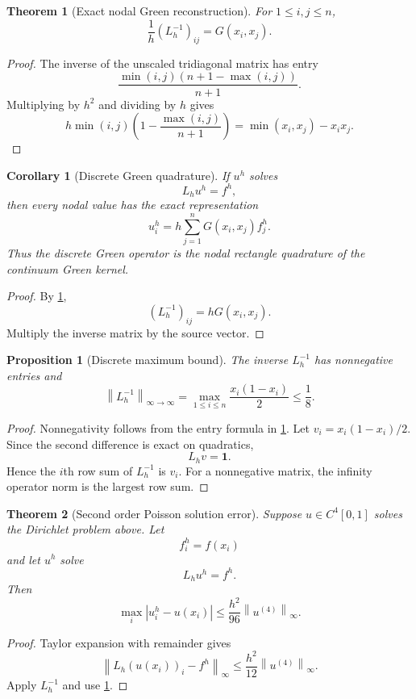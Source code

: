 \documentclass{aomart}
\newtheorem{theorem}{Theorem}[section]
\newtheorem{proposition}[proposition]{Proposition}
\newtheorem{corollary}[corollary]{Corollary}
\theoremstyle{definition}
\theoremstyle{remark}
\newcommand{\one}{\bm 1}
\newcommand{\norm}[1]{\left\lVert#1\right\rVert}
\newcommand{\abs}[1]{\left\lvert#1\right\rvert}
\begin{document}
\begin{theorem}[Exact nodal Green reconstruction]\label{thm:nodal_green}
For \(1\leq i,j\leq n\),
\[
\frac{1}{h}(L_h^{-1})_{ij}
=
G(x_i,x_j).
\]
\end{theorem}

\begin{proof}
The inverse of the unscaled tridiagonal matrix has entry
\[
\frac{\min(i,j)(n+1-\max(i,j))}{n+1}.
\]
Multiplying by \(h^2\) and dividing by \(h\) gives
\[
h\min(i,j)
\left(1-\frac{\max(i,j)}{n+1}\right)
=
\min(x_i,x_j)-x_ix_j.
\]
\end{proof}

\begin{corollary}[Discrete Green quadrature]\label{cor:discrete_green_quadrature}
If \(u^h\) solves
\[
L_hu^h=f^h,
\]
then every nodal value has the exact representation
\[
u_i^h
=
h\sum_{j=1}^nG(x_i,x_j)f_j^h.
\]
Thus the discrete Green operator is the nodal rectangle quadrature of the continuum Green kernel.
\end{corollary}

\begin{proof}
By \cref{thm:nodal_green},
\[
(L_h^{-1})_{ij}=hG(x_i,x_j).
\]
Multiply the inverse matrix by the source vector.
\end{proof}

\begin{proposition}[Discrete maximum bound]\label{prop:discrete_inverse_bound}
The inverse \(L_h^{-1}\) has nonnegative entries and
\[
\norm{L_h^{-1}}_{\infty\to\infty}
=
\max_{1\leq i\leq n}
\frac{x_i(1-x_i)}{2}
\leq
\frac18.
\]
\end{proposition}

\begin{proof}
Nonnegativity follows from the entry formula in \cref{thm:nodal_green}. Let \(v_i=x_i(1-x_i)/2\). Since the second difference is exact on quadratics,
\[
L_hv=\one.
\]
Hence the \(i\)th row sum of \(L_h^{-1}\) is \(v_i\). For a nonnegative matrix, the infinity operator norm is the largest row sum.
\end{proof}

\begin{theorem}[Second order Poisson solution error]\label{thm:poisson_error}
Suppose \(u\in C^4[0,1]\) solves the Dirichlet problem above. Let
\[
f^h_i=f(x_i)
\]
and let \(u^h\) solve
\[
L_hu^h=f^h.
\]
Then
\[
\max_i\abs{u^h_i-u(x_i)}
\leq
\frac{h^2}{96}
\norm{u^{(4)}}_\infty.
\]
\end{theorem}

\begin{proof}
Taylor expansion with remainder gives
\[
\norm{L_h(u(x_i))_i-f^h}_\infty
\leq
\frac{h^2}{12}\norm{u^{(4)}}_\infty.
\]
Apply \(L_h^{-1}\) and use \cref{prop:discrete_inverse_bound}.
\end{proof}
\end{document}
